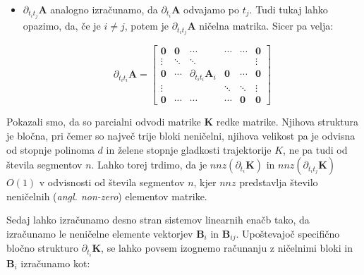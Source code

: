 \documentclass[isrm2, tisk]{fmfdelo}
\newcommand{\amat}{\mathbf{A}}
\newcommand{\kmat}{\mathbf{K}}
\begin{document}
\begin{itemize}
\item $\partial_{t_it_j}\amat$ analogno izračunamo, da $\partial_{t_i} \amat$ odvajamo po $t_j$. Tudi tukaj lahko opazimo, da, če je $i \neq j$, potem je $\partial_{t_it_j}\amat$ ničelna matrika. Sicer pa velja:

\begin{equation}
    \partial_{t_it_i} \amat =
    \begin{bmatrix}
    \mathbf{0} & \mathbf{0} & \cdots & \cdots & \cdots & \mathbf{0} \\
    \vdots & \ddots & \ddots & & & \vdots \\
    \mathbf{0} & \cdots & \partial_{t_it_i} \amat_i & \mathbf{0} & \cdots & \mathbf{0} \\
    \vdots & & & \ddots & \ddots & \vdots \\
    \mathbf{0} & \cdots & \cdots & \cdots & \mathbf{0} & \mathbf{0}
    \end{bmatrix}
\end{equation}
\end{itemize}


Pokazali smo, da so parcialni odvodi matrike $\kmat$ redke matrike. Njihova struktura je bločna, pri čemer so največ trije bloki neničelni, njihova velikost pa je odvisna od stopnje polinoma $d$ in želene stopnje gladkosti trajektorije $K$, ne pa tudi od števila segmentov $n$. Lahko torej trdimo, da je $nnz(\partial_{t_i}\kmat)$ in $nnz(\partial_{t_it_j}\kmat)$ $O(1)$ v odvisnosti od števila segmentov $n$, kjer $nnz$ predstavlja število neničelnih (\textit{angl. non-zero}) elementov matrike.

Sedaj lahko izračunamo desno stran sistemov linearnih enačb tako, da izračunamo le neničelne elemente vektorjev $\mathbf{B}_i$ in $\mathbf{B}_{ij}$. Upoštevajoč specifično bločno strukturo $\partial_{t_i}\kmat$, se lahko povsem izognemo računanju z ničelnimi bloki in $\mathbf{B}_i$ izračunamo kot:
\end{document}
